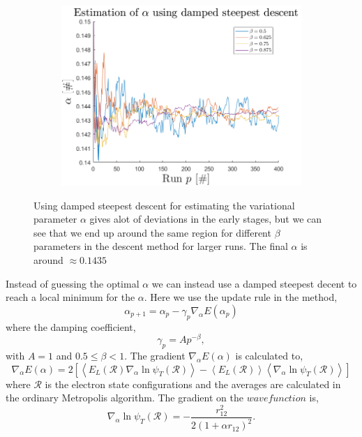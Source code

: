 \begin{figure}[H]
	\centering
	\captionsetup[subfigure]{justification=centering}
	\begin{subfigure}[b]{0.7\textwidth}
		\centering
		\includegraphics[width=\textwidth]{graphics/task4/beta_dep.png}
	\end{subfigure}
	\caption{Using damped steepest descent for estimating the variational parameter $\alpha$ gives alot of deviations in the early stages, but we can see that we end up around the same region for different $\beta$ parameters in the descent method for larger runs. The final $\alpha$ is around $\approx 0.1435$}
	\label{fig:beta_dep}
\end{figure}


Instead of guessing the optimal $\alpha$ we can instead use a damped steepest decent to reach a local minimum for the $\alpha$. Here we use the update rule in the method,
\begin{equation}
\alpha_{p+1} = \alpha_p-\gamma_p \nabla_\alpha E(\alpha_p)
\end{equation} 
where the damping coefficient,
\begin{equation}
\gamma_p=Ap^{-\beta},
\end{equation}
with $A=1$ and $0.5\leq\beta < 1$. The gradient $\nabla_\alpha E(\alpha)$ is calculated to,
\begin{equation}
\nabla_\alpha E(\alpha) = 2\left[\left<E_L(\mathcal{R})\nabla_\alpha \ln{\psi_T(\mathcal{R})}\right>-\left<E_L(\mathcal{R})\right>\left<\nabla_\alpha\ln{\psi_T(\mathcal{R})}\right>\right]
\end{equation}
where $\mathcal{R}$ is the electron state configurations and the averages are calculated in the ordinary Metropolis algorithm. The gradient on the $wave function $ is,
\begin{equation}
\nabla_\alpha \ln{\psi_T(\mathcal{R})} = -\frac{r_{12}^2}{2(1+\alpha r_{12})^2}.
\end{equation}

